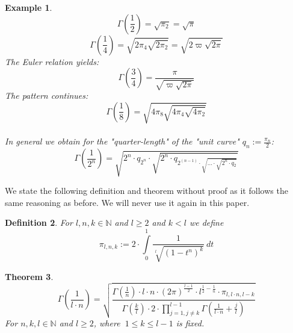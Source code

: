 \documentclass[sn-mathphys]{sn-jnl}%
\theoremstyle{thmstyleone}%
\newtheorem{theorem}{Theorem}%
\theoremstyle{thmstyletwo}%
\newtheorem{example}[theorem]{Example}%
\theoremstyle{thmstylethree}%
\newtheorem{definition}[theorem]{Definition}%
\begin{document}
\begin{example}\label{ex7}
\begin{equation}
\Gamma(\frac{1}{2}) = \sqrt{\pi_2} = \sqrt{\pi}
\end{equation}
\begin{equation}
\Gamma(\frac{1}{4}) = \sqrt{2 \pi_4 \sqrt{2\pi_2}} = \sqrt{2 \varpi \sqrt{2\pi}}
\end{equation}
The Euler relation yields:
\begin{equation}
\Gamma(\frac{3}{4}) = \frac{\pi}{\sqrt{\varpi \sqrt{2 \pi}}}
\end{equation}
The pattern continues:
\begin{equation}
\Gamma(\frac{1}{8}) = \sqrt{4 \pi_8 \sqrt{4 \pi_4 \sqrt{4\pi_2}}}
\end{equation} \\
In general we obtain for the "quarter-length" of the "unit curve" $q_n:= \frac{\pi_n}{2}$: \\
\begin{equation}
\Gamma(\frac{1}{2^{n}}) = \sqrt{2^n \cdot q_{2^n} \cdot \sqrt{2^n \cdot q_{2^{(n-1)} \cdot \sqrt{... \cdot \sqrt{2^n \cdot q_{2}}}}}}
\end{equation}
\end{example}
We state the following definition and theorem without proof as it follows the same reasoning as before. We will never use it again in this paper.
\begin{definition}\label{def8}
For $l,n,k \in \mathbb{N}$ and $l \geq 2$ and $k < l$ we define
\begin{equation}
\pi_{l,n,k} := 2 \cdot \int \limits_{0}^{1} \frac{1}{\sqrt[l]{(1-t^n)^{k}}} \ dt
\end{equation}
\end{definition}
\begin{theorem}\label{th10}
\begin{equation}
\Gamma(\frac{1}{l \cdot n}) = \sqrt{\frac{\Gamma(\frac{1}{n}) \cdot l \cdot n \cdot (2 \pi)^{\frac{l-1}{2}} \cdot l^{\frac{1}{2} - \frac{1}{n}} \cdot \pi_{l,l \cdot n,l-k}}{\Gamma(\frac{k}{l}) \cdot 2 \cdot \prod \limits_{j=1,j \neq k}^{l-1} \Gamma(\frac{1}{l \cdot n} + \frac{j}{l})}}
\end{equation}
For $n,k,l \in \mathbb{N}$ and $l \geq 2$, where $\ 1 \leq k \leq l-1$ is fixed.
\end{theorem}
\end{document}
